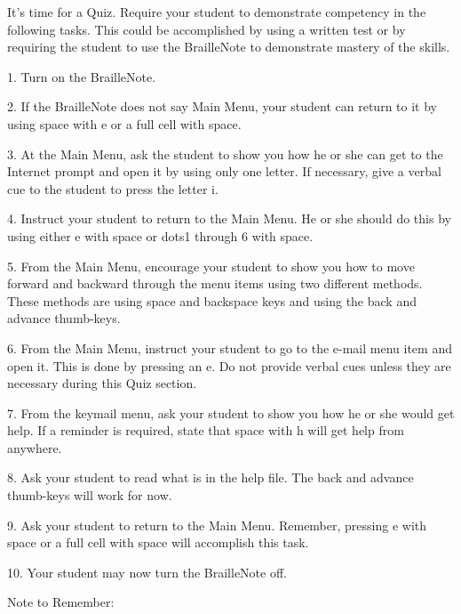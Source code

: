 \documentclass[10pt,letterpaper,twoside]{report}
\begin{document}
{{{{It's time for a Quiz.  Require your student to demonstrate competency in the following tasks.  This could be accomplished by using a written test or by requiring the student to use the BrailleNote to demonstrate mastery of the skills.



1. Turn on the BrailleNote.



2. If the BrailleNote does not say Main Menu, your student can return to it by using space with e or a full cell with space.



3.  At the Main Menu, ask the student to show you how he or she can get to the Internet prompt and open it by using only one letter.  If necessary, give a verbal cue to the student to press the letter i.



4.  Instruct your student to return to the Main Menu.  He or she should do this by using either e with space or dots1 through 6 with space.



5.  From the Main Menu, encourage your student to show you how to move forward and backward through the menu items using two different methods.  These methods are using space and backspace keys and using the back and advance thumb-keys.



6.  From the Main Menu, instruct your student to go to the e-mail menu item and open it.  This is done by pressing an e.  Do not provide verbal cues unless they are necessary during this Quiz section.



7. From the keymail menu, ask your student to show you how he or she would get help.  If a reminder is required, state that space with h will get help from anywhere.



8.  Ask your student to read what is in the help file.  The back and advance thumb-keys will work for now.



9.  Ask your student to return to the Main Menu.  Remember, pressing e with space or a full cell with space will accomplish this task.



10. Your student may now turn the BrailleNote off.



Note to Remember:



}}}}
\end{document}
